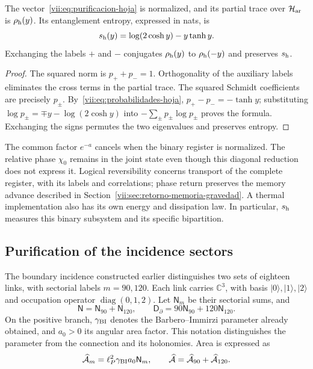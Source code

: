 \begin{proposition}
\label{vii:prop:purificacion-hoja}
The vector~\eqref{vii:eq:purificacion-hoja} is normalized, and its partial
trace over \(\mathcal H_{\rm ar}\) is \(\rho_{\rm h}(y)\).
Its entanglement entropy, expressed in nats, is
\begin{equation}
 s_{\rm h}(y)=\log(2\cosh y)-y\tanh y.
 \label{vii:eq:entropia-hoja}
\end{equation}
Exchanging the labels \(+\) and \(-\) conjugates
\(\rho_{\rm h}(y)\) to \(\rho_{\rm h}(-y)\) and preserves
\(s_{\rm h}\).
\end{proposition}
\begin{proof}
The squared norm is \(p_++p_-=1\). Orthogonality of the
auxiliary labels eliminates the cross terms in the partial trace.
The squared Schmidt coefficients are precisely \(p_\pm\).
By~\eqref{vii:eq:probabilidades-hoja},
\(p_+-p_-=-\tanh y\); substituting
\(\log p_\pm=\mp y-\log(2\cosh y)\) into
\(-\sum_\pm p_\pm\log p_\pm\) proves the formula.
Exchanging the signs permutes the two eigenvalues and preserves entropy.
\end{proof}

The common factor \(e^{-a}\) cancels when the binary register is normalized.
The relative phase \(\chi_0\) remains in the joint state even though this
diagonal reduction does not express it. Logical reversibility concerns
transport of the complete register, with its labels and correlations;
phase return preserves the memory advance described in
Section~\ref{vii:sec:retorno-memoria-gravedad}. A thermal implementation
also has its own energy and dissipation law. In particular,
\(s_{\rm h}\) measures this binary subsystem and its specific bipartition.

\subsection{Purification of the incidence sectors}
\label{vii:subsec:purificacion-sectorial}

The boundary incidence constructed earlier distinguishes two sets
of eighteen links, with sectorial labels \(m=90,120\). Each link
carries \(\mathbb C^3\), with basis \(|0\rangle,|1\rangle,|2\rangle\)
and occupation operator \(\operatorname{diag}(0,1,2)\). Let
\(\mathsf N_m\) be their sectorial sums, and
\begin{equation}
 \mathsf N=\mathsf N_{90}+\mathsf N_{120},\qquad
 \mathsf D_\partial=90\mathsf N_{90}+120\mathsf N_{120}.
 \label{vii:eq:ocupaciones-sectoriales}
\end{equation}
On the positive branch, \(\gamma_{\rm BI}\) denotes the Barbero--Immirzi
parameter already obtained, and \(a_0>0\) its angular area factor.
This notation distinguishes the parameter from the connection and its holonomies.
Area is expressed as
\begin{equation}
 \widehat{\mathcal A}_m=\ell_P^2\gamma_{\rm BI}a_0\mathsf N_m,
 \qquad
 \widehat{\mathcal A}=\widehat{\mathcal A}_{90}
                         +\widehat{\mathcal A}_{120}.
 \label{vii:eq:area-sectores}
\end{equation}

